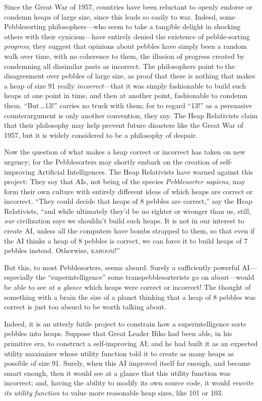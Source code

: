  Since the Great War of 1957, countries have been reluctant to
openly endorse or condemn heaps of large size, since this leads so
easily to war. Indeed, some Pebblesorting philosophers---who seem to
take a tangible delight in shocking others with their cynicism---have
entirely denied the existence of pebble-sorting \textit{progress}; they
suggest that opinions about pebbles have simply been a random walk over
time, with no coherence to them, the illusion of progress created by
condemning all dissimilar pasts as incorrect. The philosophers point to
the disagreement over pebbles of large size, as proof that there is
nothing that makes a heap of size 91 really \textit{incorrect}{}---that
it was simply fashionable to build such heaps at one point in time, and
then at another point, fashionable to condemn them.
``But\,\ldots 13!'' carries no truck
with them; for to regard ``13!'' as
a persuasive counterargument is only another convention, they say. The
Heap Relativists claim that their philosophy may help prevent future
disasters like the Great War of 1957, but it is widely considered to be
a philosophy of despair.


 Now the question of what makes a heap correct or incorrect has
taken on new urgency; for the Pebblesorters may shortly embark on the
creation of self-improving Artificial Intelligences. The Heap
Relativists have warned against this project: They say that AIs, not
being of the species \textit{Pebblesorter sapiens}, may form their own
culture with entirely different ideas of which heaps are correct or
incorrect. ``They could decide that heaps of 8 pebbles
are correct,'' say the Heap Relativists,
``and while ultimately they'd be no
righter or wronger than us, still, \textit{our} civilization says we
shouldn't build such heaps. It is not in our interest
to create AI, unless all the computers have bombs strapped to them, so
that even if the AI thinks a heap of 8 pebbles is correct, we can force
it to build heaps of 7 pebbles instead. Otherwise,
\textsc{kaboom!}''


 But this, to most Pebblesorters, seems absurd. Surely a
sufficiently powerful AI---especially the
``superintelligence'' some
transpebblesorterists go on about---would be able to see \textit{at a
glance} which heaps were correct or incorrect! The thought of something
with a brain the size of a planet thinking that a heap of 8 pebbles was
correct is just too absurd to be worth talking about.


 Indeed, it is an utterly futile project to constrain how a
superintelligence sorts pebbles into heaps. Suppose that Great Leader
Biko had been able, in his primitive era, to construct a self-improving
AI; and he had built it as an expected utility maximizer whose utility
function told it to create as many heaps as possible of size 91.
Surely, when this AI improved itself far enough, and became smart
enough, then it would see at a glance that this utility function was
incorrect; and, having the ability to modify its own source code, it
would \textit{rewrite its utility function} to value more reasonable
heap sizes, like 101 or 103.


